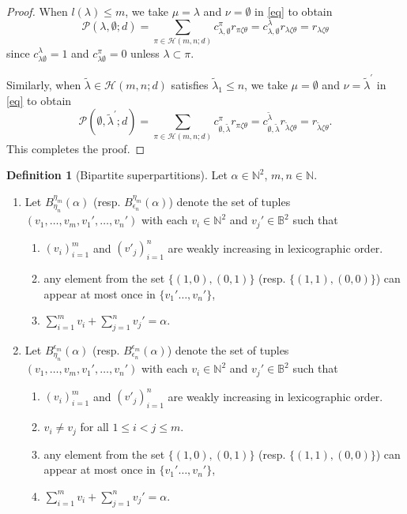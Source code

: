 \documentclass[12pt,reqno]{amsart}
\theoremstyle{definition}
\newtheorem{definition}[theorem]{Definition}
\theoremstyle{remark}
\newcommand{\Hi}{\mathcal{H}(m,n;d)}
\begin{document}
\begin{proof}
When $l(\lambda)\leq m$, we take $\mu=\lambda$ and $\nu=\emptyset$ in \eqref{eq} to obtain
$$\mathcal{P}(\lambda,\emptyset;d)=\sum_{\pi\in\Hi}c^{\pi}_{\lambda,\emptyset}r_{\pi\zeta\theta}=c^{\lambda}_{\lambda,\emptyset}r_{\lambda\zeta\theta}=r_{\lambda\zeta\theta}$$
since $c^{\lambda}_{\lambda\emptyset}=1$ and $c^{\pi}_{\lambda\emptyset}=0$ unless $\lambda\subset \pi$.

Similarly, when $\tilde\lambda \in\Hi$ satisfies $\tilde\lambda_{1}\leq n$, we take $\mu=\emptyset$ and $\nu={\tilde{\lambda}}^{'}$ in \eqref{eq} to obtain
$$\mathcal{P}(\emptyset,\tilde\lambda^{'} ;d)=\sum_{\pi\in\Hi}c^{\pi}_{\emptyset,\tilde\lambda}r_{\pi\zeta\theta}=c^{\tilde\lambda}_{\emptyset,\tilde\lambda}r_{\tilde\lambda\zeta\theta}=r_{\tilde\lambda\zeta\theta}.$$ This completes the proof.
\end{proof}

\begin{definition}[Bipartite superpartitions]\label{bipartiteSuperPartitions}
    Let $\alpha\in\mathbb{N}^{2}$, $m,n\in\mathbb{N}$.
    \begin{enumerate}
        
    \item Let $B^{\eta_m}_{\eta_n}(\alpha)$ (resp. $B^{\eta_m}_{\epsilon_n}(\alpha)$) denote the set of tuples $(v_{1},\dotsc,v_{m},v_{1}',\dotsc, v_{n}')$ with each $v_{i}\in\mathbb{N}^{2}$ and $v_{j}'\in\mathbb{B}^{2}$ such that
    \begin{enumerate}
        \item $(v_i)_{i=1}^{m}$ and $(v'_j)_{i=1}^{n}$ are weakly increasing in lexicographic order.
        \item any element from the set $\{(1,0),(0,1)\}$ (resp. $\{(1,1), (0,0)\}$) can appear at most once in $\{v_{1}'\dotsc,v_{n}'\}$,
        \item $\sum_{i=1}^{m}v_{i}+\sum_{j=1}^{n}v_{j}'=\alpha$.
    \end{enumerate}
    \item Let $B^{\epsilon_m}_{\eta_n}(\alpha)$ (resp. $B^{\epsilon_m}_{\epsilon_n}(\alpha)$) denote the set of tuples $(v_{1},\dotsc,v_{m},v_{1}',\dotsc, v_{n}')$ with each $v_{i}\in\mathbb{N}^{2}$ and $v_{j}'\in\mathbb{B}^{2}$ such that
    \begin{enumerate}
        \item $(v_i)_{i=1}^{m}$ and $(v'_j)_{i=1}^{n}$ are weakly increasing in lexicographic order.
        \item $v_{i}\neq v_{j}$ for all $1\leq i<j\leq m$.
        \item any element from the set $\{(1,0),(0,1)\}$ (resp. $\{(1,1), (0,0)\}$) can appear at most once in $\{v_{1}'\dotsc,v_{n}'\}$,
        \item $\sum_{i=1}^{m}v_{i}+\sum_{j=1}^{n}v_{j}'=\alpha$.
    \end{enumerate}
    \end{enumerate}
\end{definition}
\end{document}
